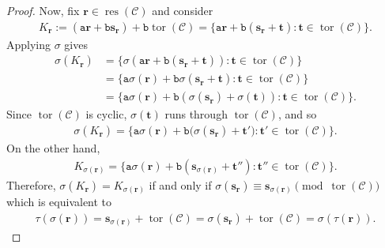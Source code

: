 \documentclass[12pt]{article}
\theoremstyle{definition}
\theoremstyle{plain}
\begin{document}
\begin{proof}
Now, fix  $\mathbf{r} \in \operatorname{res} (\mathcal{C})$ and consider
\begin{align*}
K_{\mathbf{r}}
:=
( \mathtt{a} \mathbf{r} + \mathtt{b} \mathbf{s}_{\mathbf{r}}   )
+ \mathtt{b} \operatorname{tor} (\mathcal{C})
=
\{
\mathtt{a} \mathbf{r} + \mathtt{b} (\mathbf{s}_{\mathbf{r}} + \mathbf{t})
\mathrel{:}  \mathbf{t} \in \operatorname{tor}(\mathcal{C})
\}  .
\end{align*}
Applying $\sigma$ gives
\begin{align*}
\sigma(K_{\mathbf{r}})
&= \{
\sigma( \mathtt{a} \mathbf{r} + \mathtt{b} (\mathbf{s}_{\mathbf{r}} + \mathbf{t} ) )
\mathrel{:}  \mathbf{t} \in \operatorname{tor}(\mathcal{C})
\}  \\
&=
\{
\mathtt{a}\sigma(\mathbf{r}) + \mathtt{b} \sigma(\mathbf{s}_{\mathbf{r}} + \mathbf{t})
\mathrel{:}  \mathbf{t} \in \operatorname{tor}(\mathcal{C})
\} \\
&=
\{
\mathtt{a}\sigma(\mathbf{r}) + \mathtt{b} (\sigma(\mathbf{s}_{\mathbf{r}}) + \sigma(\mathbf{t}) )
\mathrel{:}  \mathbf{t} \in \operatorname{tor}(\mathcal{C})
\} .
\end{align*}
Since $\operatorname{tor}(\mathcal{C})$ is cyclic, $\sigma(\mathbf{t})$ runs through
$\operatorname{tor}(\mathcal{C})$, and so
\begin{align*}
\sigma(K_{\mathbf{r}})
=
\{
\mathtt{a}\sigma(\mathbf{r}) + \mathtt{b}\big(\sigma(\mathbf{s}_{\mathbf{r}}) + \mathbf{t}'\big)
\mathrel{:}   \mathbf{t}' \in \operatorname{tor}(\mathcal{C})
\} .
\end{align*}
On the other hand,
\begin{align*}
K_{\sigma(\mathbf{r})}
=
\{
\mathtt{a} \sigma(\mathbf{r}) + \mathtt{b} (\mathbf{s}_{\sigma(\mathbf{r})} + \mathbf{t}'' )
\mathrel{:}   \mathbf{t}'' \in \operatorname{tor}(\mathcal{C})
\} .
\end{align*}
Therefore, $\sigma(K_{\mathbf{r}}) = K_{\sigma(\mathbf{r})}$ if and only if
$
\sigma(\mathbf{s}_{\mathbf{r}})
\equiv
\mathbf{s}_{\sigma(\mathbf{r})}
\pmod{\operatorname{tor}(\mathcal{C})}
$
which is equivalent to
\begin{align*}
\tau (\sigma(\mathbf{r}))
=
\mathbf{s}_{\sigma(\mathbf{r})} + \operatorname{tor}(\mathcal{C})
=
\sigma(\mathbf{s}_{\mathbf{r}}) + \operatorname{tor}(\mathcal{C})
=
\sigma( \tau (\mathbf{r})).
\end{align*}



\end{proof}
\end{document}
